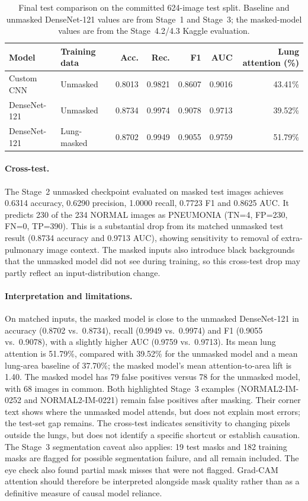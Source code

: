 \begin{table}[t]
  \centering
  \small
  \begin{tabular}{llrrrrr}
    \toprule
    Model & Training data & Acc. & Rec. & F1 & AUC & Lung attention (\%) \\
    \midrule
    Custom CNN   & Unmasked & 0.8013 & 0.9821 & 0.8607 & 0.9016 & 43.41\% \\
    DenseNet-121 & Unmasked & 0.8734 & 0.9974 & 0.9078 & 0.9713 & 39.52\% \\
    DenseNet-121 & Lung-masked & 0.8702 & 0.9949 & 0.9055 & 0.9759 & 51.79\% \\
    \bottomrule
  \end{tabular}
  \caption{Final test comparison on the committed 624-image test split. Baseline and unmasked DenseNet-121 values are from Stage~1 and Stage~3; the masked-model values are from the Stage~4.2/4.3 Kaggle evaluation.}
  \label{tab:masking-comparison}
\end{table}

\paragraph{Cross-test.}
The Stage~2 unmasked checkpoint evaluated on masked test images achieves 0.6314 accuracy, 0.6290 precision,
1.0000 recall, 0.7723 F1 and 0.8625 AUC. It predicts 230 of the 234 NORMAL images as PNEUMONIA
(TN=4, FP=230, FN=0, TP=390). This is a substantial drop from its matched unmasked test result
(0.8734 accuracy and 0.9713 AUC), showing sensitivity to removal of extra-pulmonary image context.
The masked inputs also introduce black backgrounds that the unmasked model did not see during training,
so this cross-test drop may partly reflect an input-distribution change.

\paragraph{Interpretation and limitations.}
On matched inputs, the masked model is close to the unmasked DenseNet-121 in accuracy (0.8702 vs.~0.8734),
recall (0.9949 vs.~0.9974) and F1 (0.9055 vs.~0.9078), with a slightly higher AUC (0.9759 vs.~0.9713).
Its mean lung attention is 51.79\%, compared with 39.52\% for the unmasked model and a mean lung-area
baseline of 37.70\%; the masked model's mean attention-to-area lift is 1.40. The masked model has 79 false
positives versus 78 for the unmasked model, with 68 images in common. Both highlighted Stage~3 examples
(NORMAL2-IM-0252 and NORMAL2-IM-0221) remain false positives after masking. Their corner text shows where
the unmasked model attends, but does not explain most errors; the test-set gap remains. The cross-test
indicates sensitivity to changing pixels outside the lungs, but does not identify a specific shortcut or
establish causation. The Stage~3 segmentation caveat also applies: 19 test masks and 182 training masks are
flagged for possible segmentation failure, and all remain included. The eye check also found partial mask
misses that were not flagged. Grad-CAM attention should therefore be interpreted alongside mask quality
rather than as a definitive measure of causal model reliance.
